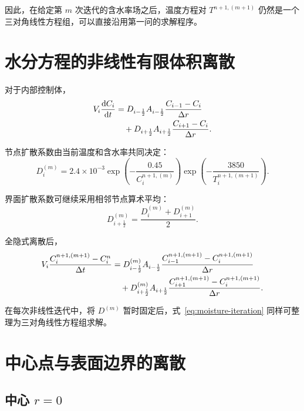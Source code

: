 \documentclass[UTF8,a4paper,12pt]{ctexart}
\begin{document}
因此，在给定第 $m$ 次迭代的含水率场之后，温度方程对 $T^{n+1,(m+1)}$ 仍然是一个三对角线性方程组，可以直接沿用第一问的求解程序。

\section{水分方程的非线性有限体积离散}

对于内部控制体，
\begin{align}
    V_i\frac{\mathrm{d}C_i}{\mathrm{d}t}
    &=
    D_{i-\frac12}A_{i-\frac12}
    \frac{C_{i-1}-C_i}{\Delta r}
    \notag\\
    &\quad+
    D_{i+\frac12}A_{i+\frac12}
    \frac{C_{i+1}-C_i}{\Delta r}.
    \label{eq:moisture-fvm}
\end{align}

节点扩散系数由当前温度和含水率共同决定：
\begin{equation}
    D_i^{(m)}
    =
    2.4\times10^{-3}
    \exp\!\left(
        -\frac{0.45}{C_i^{n+1,(m)}}
    \right)
    \exp\!\left(
        -\frac{3850}{T_i^{n+1,(m+1)}}
    \right).
    \label{eq:Di}
\end{equation}

界面扩散系数可继续采用相邻节点算术平均：
\begin{equation}
    D_{i+\frac12}^{(m)}
    =
    \frac{D_i^{(m)}+D_{i+1}^{(m)}}{2}.
    \label{eq:Dface}
\end{equation}

全隐式离散后，
\begin{align}
    V_i
    \frac{
        C_i^{n+1,(m+1)}-C_i^n
    }{\Delta t}
    &=
    D_{i-\frac12}^{(m)}A_{i-\frac12}
    \frac{
        C_{i-1}^{n+1,(m+1)}
        -
        C_i^{n+1,(m+1)}
    }{\Delta r}
    \notag\\
    &\quad+
    D_{i+\frac12}^{(m)}A_{i+\frac12}
    \frac{
        C_{i+1}^{n+1,(m+1)}
        -
        C_i^{n+1,(m+1)}
    }{\Delta r}.
    \label{eq:moisture-iteration}
\end{align}

在每次非线性迭代中，将 $D^{(m)}$ 暂时固定后，式~\eqref{eq:moisture-iteration} 同样可整理为三对角线性方程组求解。

\section{中心点与表面边界的离散}

\subsection{中心 $r=0$}
\end{document}

